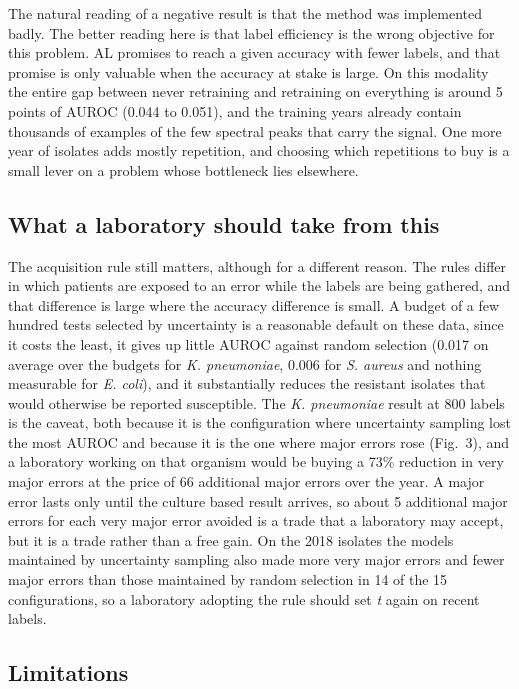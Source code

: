 \documentclass[conference,a4paper]{IEEEtran}
\begin{document}
The natural reading of a negative result is that the method was implemented badly. The better reading here is that label efficiency is the wrong objective for this problem. AL promises to reach a given accuracy with fewer labels, and that promise is only valuable when the accuracy at stake is large. On this modality the entire gap between never retraining and retraining on everything is around 5 points of AUROC (0.044 to 0.051), and the training years already contain thousands of examples of the few spectral peaks that carry the signal. One more year of isolates adds mostly repetition, and choosing which repetitions to buy is a small lever on a problem whose bottleneck lies elsewhere.

\subsection{What a laboratory should take from this}

The acquisition rule still matters, although for a different reason. The rules differ in which patients are exposed to an error while the labels are being gathered, and that difference is large where the accuracy difference is small. A budget of a few hundred tests selected by uncertainty is a reasonable default on these data, since it costs the least, it gives up little AUROC against random selection (0.017 on average over the budgets for \textit{K. pneumoniae}, 0.006 for \textit{S. aureus} and nothing measurable for \textit{E. coli}), and it substantially reduces the resistant isolates that would otherwise be reported susceptible. The \textit{K. pneumoniae} result at 800 labels is the caveat, both because it is the configuration where uncertainty sampling lost the most AUROC and because it is the one where major errors rose (Fig.~3), and a laboratory working on that organism would be buying a 73\% reduction in very major errors at the price of 66 additional major errors over the year. A major error lasts only until the culture based result arrives, so about 5 additional major errors for each very major error avoided is a trade that a laboratory may accept, but it is a trade rather than a free gain. On the 2018 isolates the models maintained by uncertainty sampling also made more very major errors and fewer major errors than those maintained by random selection in 14 of the 15 configurations, so a laboratory adopting the rule should set \textit{t} again on recent labels.

\subsection{Limitations}
\end{document}
